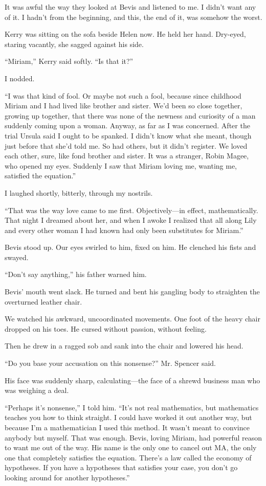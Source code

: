 \documentclass{novel}
\begin{document}
\scenestars

It was awful the way they looked at Bevis and listened to me. I didn’t want any of it. I hadn’t from the beginning, and this, the end of it, was somehow the worst.

Kerry was sitting on the sofa beside Helen now. He held her hand. Dry-eyed, staring vacantly, she sagged against his side.

“Miriam,” Kerry said softly. “Is that it?”

I nodded. 

“I was that kind of fool. Or maybe not such a fool, because since childhood Miriam and I had lived like brother and sister. We’d been so close together, growing up together, that there was none of the newness and curiosity of a man suddenly coming upon a woman. Anyway, as far as I was concerned. After the trial Ursula said I ought to be spanked. I didn’t know what she meant, though just before that she’d told me. So had others, but it didn’t register. We loved each other, sure, like fond brother and sister. It was a stranger, Robin Magee, who opened my eyes. Suddenly I saw that Miriam loving me, wanting me, satisfied the equation.”

I laughed shortly, bitterly, through my nostrils.

“That was the way love came to me first. Objectively—in effect, mathematically. That night I dreamed about her, and when I awoke I realized that all along Lily and every other woman I had known had only been substitutes for Miriam.”

Bevis stood up. Our eyes swirled to him, fixed on him. He clenched his fists and swayed.

“Don’t say anything,” his father warned him.

Bevis’ mouth went slack. He turned and bent his gangling body to straighten the overturned leather chair. 

We watched his awkward, uncoordinated movements. One foot of the heavy chair dropped on his toes. He cursed without passion, without feeling. 

Then he drew in a ragged sob and sank into the chair and lowered his head.

“Do you base your accusation on this nonsense?” Mr. Spencer said.

His face was suddenly sharp, calculating—the face of a shrewd business man who was weighing a deal.

“Perhaps it’s nonsense,” I told him. “It’s not real mathematics, but mathematics teaches you how to think straight. I could have worked it out another way, but because I’m a mathematician I used this method. It wasn’t meant to convince anybody but myself. That was enough. Bevis, loving Miriam, had powerful reason to want me out of the way. His name is the only one to cancel out MA, the only one that completely satisfies the equation. There’s a law called the economy of hypotheses. If you have a hypotheses that satisfies your case, you don’t go looking around for another hypotheses.”
\end{document}
